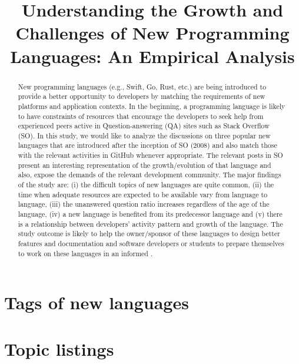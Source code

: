 \documentclass[acmsmall,table,xcdraw]{acmart}
\title{
Understanding the Growth and Challenges of New Programming Languages: An Empirical Analysis
}
\begin{document}
\newcommand{\rcomment}[1] { \textcolor{red}{#1}}
\newcommand{\boxtext}[1]{\begin{longfbox}#1\end{longfbox}}
\newcommand{\eqrow}[1]{
    \vbox{
        \begin{equation}
            \nonumber
            \begin{split}
                #1 \hspace{10em}
            \end{split}
        \end{equation}
        } \\
     }

\begin{abstract}
New programming languages (e.g., Swift, Go, Rust, etc.) are being introduced to provide a better opportunity to developers by matching the requirements of new platforms and application contexts. In the beginning, a programming language is likely to have constraints of resources that encourage the developers to seek help from experienced peers active in Question-answering (QA) sites such as Stack Overflow (SO). In this study, we would like to analyze the discussions on three popular new languages that are introduced after the inception of SO (2008) and also match those with the relevant activities in GitHub whenever appropriate. The relevant posts in SO present an interesting representation of the growth/evolution of that language and also, expose the demands of the relevant development community. The major findings of the study are: (i) the difficult topics of new languages are quite common, (ii) the time when adequate resources are expected to be available vary from language to language, (iii) the unanswered question ratio increases regardless of the age of the language, (iv) a new language is benefited from its predecessor language and (v) there is a relationship between developers' activity pattern and growth of the language. The study outcome is likely to help the owner/sponsor of these languages to design better features and documentation and software developers or students to prepare themselves to work on these languages in an informed  .
\end{abstract}
\maketitle














\pagebreak
\appendix
\section{Tags of new languages}
\label{appendix:tagrelevance}


\section{Topic listings}
\label{appendix:LDA topic}

    
\end{document}
